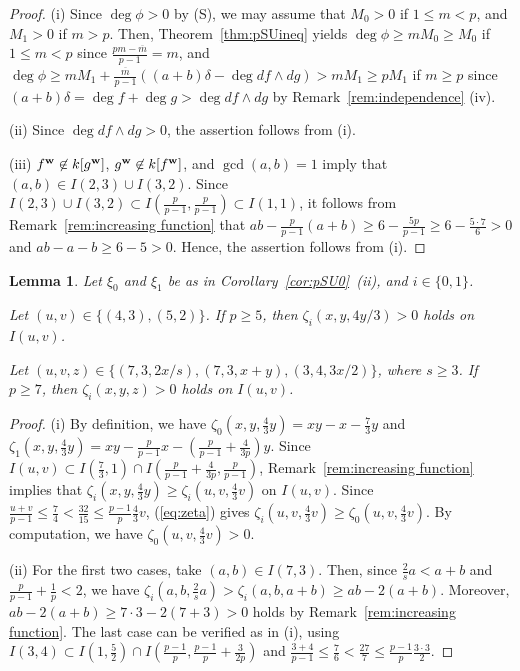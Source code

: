 \documentclass{amsart}
\theoremstyle{plain}
\newtheorem{lem}[thm]{Lemma}
\theoremstyle{definition}
\newcommand{\nd}{\noindent}
\newcommand{\ol}{\overline}
\newcommand{\w}{{\bf w}}
\begin{document}
\begin{proof}
(i) 
Since $\deg \phi >0$ by (S), 
we may assume that $M_0>0$ if $1\le m<p$, 
and $M_1>0$ if $m>p$. 
Then, Theorem~\ref{thm:pSUineq} yields 
$\deg \phi \ge mM_0\ge M_0$ if $1\le m<p$ 
since $\frac{pm-\ol{m}}{p-1}=m$, 
and $\deg \phi \ge 
mM_1+\frac{\ol{m}}{p-1}((a+b)\delta -\deg df\wedge dg)>mM_1\ge pM_1$ 
if $m\ge p$ 
since $(a+b)\delta =\deg f+\deg g>\deg df\wedge dg$ by 
Remark~\ref{rem:independence} (iv). 



(ii) 
Since $\deg df\wedge dg>0$, 
the assertion follows from (i). 


(iii) 
$f^{\w }\not\in k[g^{\w }]$, $g^{\w }\not\in k[f^{\w }]$, 
and $\gcd (a,b)=1$ imply that $(a,b)\in I(2,3)\cup I(3,2)$. 
Since 
$I(2,3)\cup I(3,2)
\subset I(\frac{p}{p-1},\frac{p}{p-1})\subset I(1,1)$, 
it follows from 
Remark~\ref{rem:increasing function} that 
$ab-\frac{p}{p-1}(a+b)\ge 6-\frac{5p}{p-1}
\ge 6-\frac{5\cdot 7}{6}>0$ 
and $ab-a-b\ge 6-5>0$. 
Hence, the assertion follows from (i). 
\end{proof}



\begin{lem}\label{lem:increasing function}
Let $\xi _0$ and $\xi _1$ be as in 
Corollary~{\rm \ref{cor:pSU0}~(ii)}, 
and $i\in \{ 0,1\} $. 


\nd{\rm (i)} 
Let $(u,v)\in \{ (4,3),(5,2)\} $. 
If $p\ge 5$, 
then $\zeta _i(x,y,4y/3)>0$ holds on $I(u,v)$. 


\nd{\rm (ii)} 
Let $(u,v,z)\in \{ (7,3,2x/s),(7,3,x+y),(3,4,3x/2)\} $, 
where $s \ge 3$. 
If $p\ge 7$, 
then $\zeta _i(x,y,z)>0$ holds on $I(u,v)$. 
\end{lem}

\begin{proof}
(i) 
By definition, we have 
$\zeta _0(x,y,\frac{4}{3}y)=xy-x-\frac{7}{3}y$ and 
$\zeta _1(x,y,\frac{4}{3}y)=xy-\frac{p}{p-1}x-(\frac{p}{p-1}+\frac{4}{3p})y$. 
Since 
$I(u,v)\subset 
I(\frac{7}{3},1)\cap I(\frac{p}{p-1}+\frac{4}{3p},\frac{p}{p-1})$, 
Remark~\ref{rem:increasing function} implies that 
$\zeta _i(x,y,\frac{4}{3}y)\ge \zeta _i(u,v,\frac{4}{3}v)$ 
on $I(u,v)$. 
Since 
$\frac{u+v}{p-1}\le \frac{7}{4}<\frac{32}{15}\le \frac{p-1}{p}\frac{4}{3}v$, 
(\ref{eq:zeta}) gives 
$\zeta _i(u,v,\frac{4}{3}v)\ge \zeta _0(u,v,\frac{4}{3}v)$. 
By computation, 
we have $\zeta _0(u,v,\frac{4}{3}v)>0$. 


(ii) 
For the first two cases, 
take $(a,b)\in I(7,3)$. 
Then, 
since 
$\frac{2}{s}a<a+b$ and $\frac{p}{p-1}+\frac{1}{p}<2$, 
we have 
$\zeta _i(a,b,\frac{2}{s}a)>\zeta _i(a,b,a+b)\ge ab-2(a+b)$. 
Moreover, 
$ab-2(a+b)\ge 7\cdot 3-2(7+3)>0$ 
holds 
by Remark~\ref{rem:increasing function}. 
The last case can be verified as in (i), 
using 
$I(3,4)\subset 
I(1,\frac{5}{2})\cap I(\frac{p-1}{p},\frac{p-1}{p}+\frac{3}{2p})$ 
and 
$\frac{3+4}{p-1}\le \frac{7}{6}<\frac{27}{7}
\le \frac{p-1}{p}\frac{3\cdot 3}{2}$. 
\end{proof}
\end{document}
